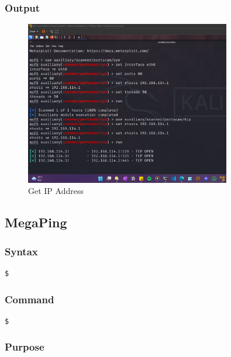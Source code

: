\documentclass[11pt]{article}
\begin{document}
\subsubsection*{Output}
\begin{figure}[H]
    \centering
    \includegraphics[width=0.8\textwidth]{metasploit tcp (3).png}
    \caption{Get IP Address}
    \label{fig:1}
\end{figure}

\subsection{MegaPing}

\subsubsection*{Syntax}
\begin{verbatim}
$
\end{verbatim}

\subsubsection*{Command}
\begin{verbatim}
$
\end{verbatim}

\subsubsection*{Purpose}
\end{document}

